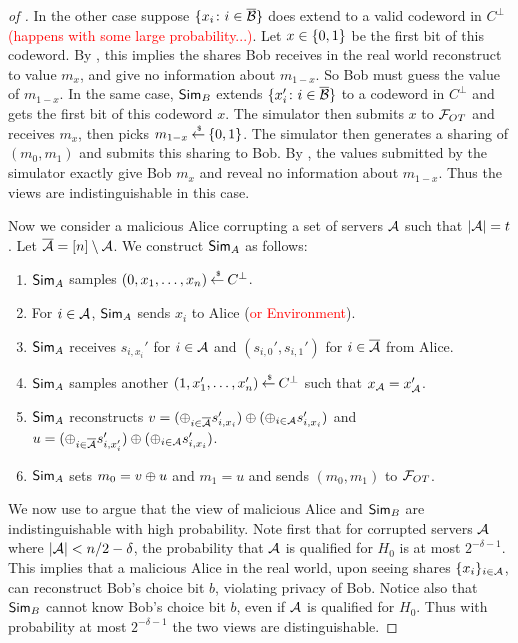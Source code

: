 \begin{proof}[of ]
	In the other case suppose $\{x_i \colon i \in \overline{{\mathcal B}} \}$ does extend to a valid codeword in $C^\perp$ \textcolor{red}{(happens with some large probability...)}.
	Let $x \in {\{0,1\}}$ be the first bit of this codeword.
	By , this implies the shares Bob receives in the real world reconstruct to value $m_x$, and give no information about $m_{1-x}$.
	So Bob must guess the value of $m_{1-x}$.
	In the same case, $\mathsf{Sim}_B$ extends $\{ x_i' \colon i \in \overline{{\mathcal B}} \}$ to a codeword in $C^\perp$ and gets the first bit of this codeword $x$.
	The simulator then submits $x$ to ${\mathcal F}_{OT}$ and receives $m_x$, then picks $m_{1-x} \mathbin{\stackrel{\mbox{\,\tiny \$}}{\gets}} {\{0,1\}}$.
	The simulator then generates a sharing of $(m_0, m_1)$ and submits this sharing to Bob.
	By , the values submitted by the simulator exactly give Bob $m_x$ and reveal no information about $m_{1-x}$.
	Thus the views are indistinguishable in this case.
	
	Now we consider a malicious Alice corrupting a set of servers ${\mathcal A}$ such that $|{\mathcal A}| = t$.
	Let $\overline{{\mathcal A}} = [n]\setminus{\mathcal A}$.
	We construct $\mathsf{Sim}_A$ as follows:
	\begin{enumerate}
		\item $\mathsf{Sim}_A$ samples $(0, x_1,\dotsc, x_n) \mathbin{\stackrel{\mbox{\,\tiny \$}}{\gets}} C^\perp$.
		\item For $i \in {\mathcal A}$, $\mathsf{Sim}_A$ sends $x_i$ to Alice (\textcolor{red}{or Environment}).
		\item $\mathsf{Sim}_A$ receives $s_{i,x_i}'$ for $i \in {\mathcal A}$ and $(s_{i,0}', s_{i,1}')$ for $i \in \overline{{\mathcal A}}$ from Alice.
		\item $\mathsf{Sim}_A$ samples another $(1, x_1', \dotsc, x_n') \mathbin{\stackrel{\mbox{\,\tiny \$}}{\gets}} C^\perp$ such that $x_{\mathcal A} = x'_{\mathcal A}$.
		\item $\mathsf{Sim}_A$ reconstructs $v = (\oplus_{i \in \overline{{\mathcal A}}} s_{i,x_i}') \oplus (\oplus_{i \in {\mathcal A}} s_{i,x_i}')$ and $u = (\oplus_{i \in \overline{{\mathcal A}}} s_{i,x_i'}')\oplus (\oplus_{i \in {\mathcal A}} s_{i,x_i}')$.
		\item $\mathsf{Sim}_A$ sets $m_0 = v \oplus u$ and $m_1 = u$ and sends $(m_0, m_1)$ to ${\mathcal F}_{OT}$.
	\end{enumerate}
	We now use  to argue that the view of malicious Alice and $\mathsf{Sim}_B$ are indistinguishable with high probability.
	Note first that for corrupted servers ${\mathcal A}$ where $|{\mathcal A}| < n/2 - \delta$, the probability that ${\mathcal A}$ is qualified for $H_0$ is at most $2^{-\delta-1}$.
	This implies that a malicious Alice in the real world, upon seeing shares $\{x_i\}_{i \in {\mathcal A}}$, can reconstruct Bob's choice bit $b$, violating privacy of Bob.
	Notice also that $\mathsf{Sim}_B$ cannot know Bob's choice bit $b$, even if ${\mathcal A}$ is qualified for $H_0$.
	Thus with probability at most $2^{-\delta-1}$ the two views are distinguishable.
	

\end{proof}
